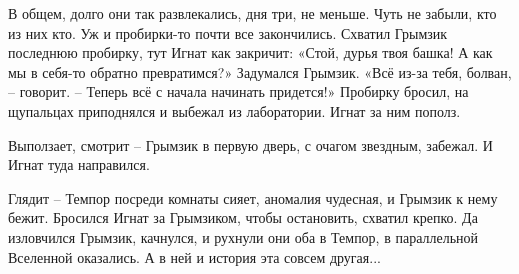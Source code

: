 \documentclass[ebook,oneside,final,openright]{memoir}
\begin{document}
\par
В общем, долго они так развлекались, дня три, не меньше. Чуть не забыли, кто из них кто. Уж и пробирки-то почти все закончились. Схватил Грымзик последнюю пробирку, тут Игнат как закричит: «Стой, дурья твоя башка! А как мы в себя-то обратно превратимся?» Задумался Грымзик. «Всё из-за тебя, болван, – говорит. – Теперь всё с начала начинать придется!» Пробирку бросил, на щупальцах приподнялся и выбежал из лаборатории. Игнат за ним пополз.\par
\par
Выползает, смотрит – Грымзик в первую дверь, с очагом звездным, забежал. И Игнат туда направился.\par
\par
Глядит – Темпор посреди комнаты сияет, аномалия чудесная, и Грымзик к нему бежит. Бросился Игнат за Грымзиком, чтобы остановить, схватил крепко. Да изловчился Грымзик, качнулся, и рухнули они оба в Темпор, в параллельной Вселенной оказались. А в ней и история эта совсем другая...\par
\end{document}
